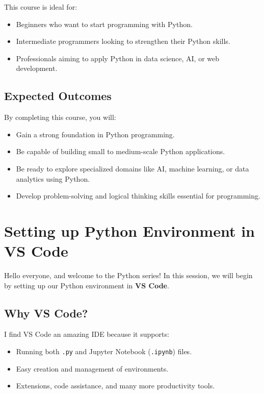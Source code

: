 This course is ideal for:

\begin{itemize}
    \item Beginners who want to start programming with Python.
    \item Intermediate programmers looking to strengthen their Python skills.
    \item Professionals aiming to apply Python in data science, AI, or web development.
\end{itemize}

\section{Expected Outcomes}

By completing this course, you will:

\begin{itemize}
    \item Gain a strong foundation in Python programming.
    \item Be capable of building small to medium-scale Python applications.
    \item Be ready to explore specialized domains like AI, machine learning, or data analytics using Python.
    \item Develop problem-solving and logical thinking skills essential for programming.
\end{itemize}



\chapter{Setting up Python Environment in VS Code}

Hello everyone, and welcome to the Python series!  
In this session, we will begin by setting up our Python environment in \textbf{VS Code}.

\section{Why VS Code?}
I find VS Code an amazing IDE because it supports:
\begin{itemize}
    \item Running both \texttt{.py} and Jupyter Notebook (\texttt{.ipynb}) files.
    \item Easy creation and management of environments.
    \item Extensions, code assistance, and many more productivity tools.
\end{itemize}

